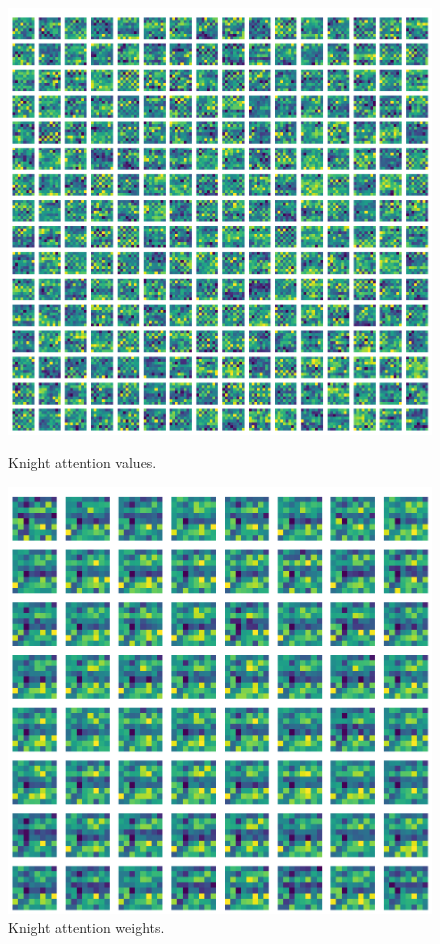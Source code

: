 \begin{figure}[H]
  \begin{minipage}{0.475\textwidth}
    \centering
    \includegraphics[width=\textwidth]{project/img/attention_maps/N_attention_1.png}
    \caption{Knight attention values.}
    \label{atnN}
  \end{minipage}
  \hspace{0.05\textwidth}
  \begin{minipage}{0.475\textwidth}
    \centering
    \includegraphics[width=\textwidth]{project/img/attention_maps/N_weights_1.png}
    \caption{Knight attention weights.}
    \label{atnN1}
  \end{minipage}
\end{figure}


